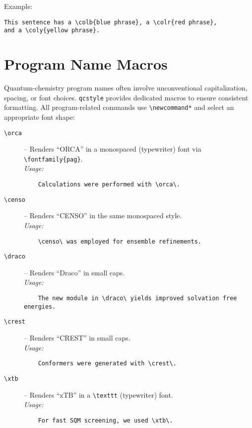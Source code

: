 \documentclass[a4paper,12pt]{article}
\begin{document}
\noindent Example:
\begin{verbatim}
This sentence has a \colb{blue phrase}, a \colr{red phrase}, 
and a \coly{yellow phrase}.
\end{verbatim}

\section{Program Name Macros}
\label{sec:programs}
Quantum-chemistry program names often involve unconventional capitalization, spacing, or font choices. \texttt{qcstyle} provides dedicated macros to ensure consistent formatting. All program-related commands use \verb|\newcommand*| and select an appropriate font shape:

\begin{description}
  \item[\texttt{\textbackslash orca}]  – Renders “ORCA” in a monospaced (typewriter) font via \verb|\fontfamily{pag}|.\\
    \textit{Usage:} 
    \begin{verbatim}
    Calculations were performed with \orca\.
    \end{verbatim}

  \item[\texttt{\textbackslash censo}] – Renders “CENSO” in the same monospaced style.\\
    \textit{Usage:} 
    \begin{verbatim}
    \censo\ was employed for ensemble refinements.
    \end{verbatim}

    \item[\texttt{\textbackslash draco}] – Renders “Draco” in small caps.\\
    \textit{Usage:}
    \begin{verbatim}
    The new module in \draco\ yields improved solvation free energies.
    \end{verbatim}

    \item[\texttt{\textbackslash crest}] – Renders “CREST” in small caps.\\
    \textit{Usage:}
    \begin{verbatim}
    Conformers were generated with \crest\.
    \end{verbatim}

    \item[\texttt{\textbackslash xtb}]   – Renders “xTB” in a \verb|\texttt| (typewriter) font.\\
    \textit{Usage:}
    \begin{verbatim}
    For fast SQM screening, we used \xtb\.
    \end{verbatim}


\end{description}
\end{document}
